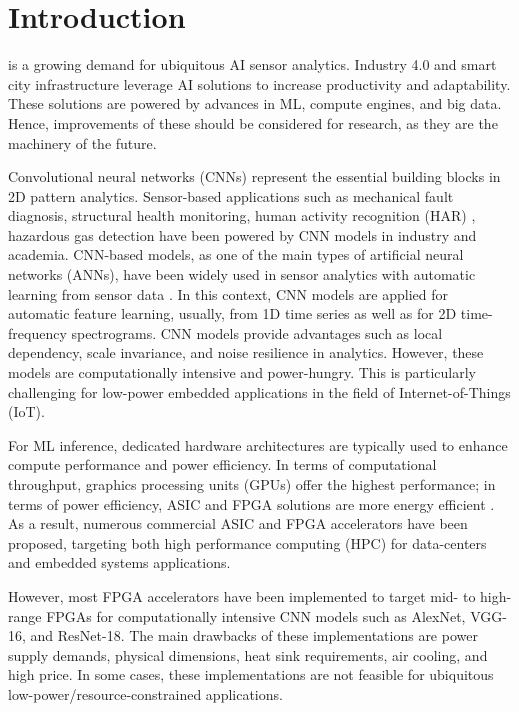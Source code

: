 
\section{Introduction}
\label{sec:introduction}
 is a growing demand for ubiquitous AI sensor analytics. Industry 4.0 and smart city infrastructure leverage AI solutions to increase productivity and adaptability\cite{lom2016industry}. These solutions are powered by advances in ML, compute engines, and big data. Hence, improvements of these should be considered for research, as they are the machinery of the future.

Convolutional neural networks (CNNs) represent the essential building blocks in 2D pattern analytics. Sensor-based applications such as mechanical fault diagnosis\cite{li2019sensor,dong2018rolling}, structural health monitoring\cite{nagayama2007structural}, human activity recognition (HAR) \cite{wang2019deep}, hazardous gas detection\cite{kim2017hazardous} have been powered by CNN models in industry and academia. CNN-based models, as one of the main types of artificial neural networks (ANNs), have been widely used in sensor analytics with automatic learning from sensor data \cite{ince2016real, janssens2016convolutional, abdeljaber2017real, guo2016hierarchical}. In this context, CNN models are applied for automatic feature learning, usually, from 1D time series as well as for 2D time-frequency spectrograms. CNN models provide advantages such as local dependency, scale invariance, and noise resilience in analytics\cite{du2014leveraging}. However, these models are computationally intensive and power-hungry. This is particularly challenging for low-power embedded applications in the field of Internet-of-Things (IoT).

For ML inference, dedicated hardware architectures are typically used to enhance compute performance and power efficiency. In terms of computational throughput, graphics processing units (GPUs) offer the highest performance; in terms of power efficiency, ASIC and FPGA solutions are more energy efficient \cite{nurvitadhi2017can}. As a result, numerous commercial ASIC and FPGA accelerators have been proposed, targeting both high performance computing (HPC) for data-centers and embedded systems applications.

However, most FPGA accelerators have been implemented to target mid- to high-range FPGAs for computationally intensive CNN models such as AlexNet, VGG-16, and ResNet-18. The main drawbacks of these implementations are power supply demands, physical dimensions, heat sink requirements, air cooling, and high price. In some cases, these implementations are not feasible for ubiquitous low-power/resource-constrained applications.

